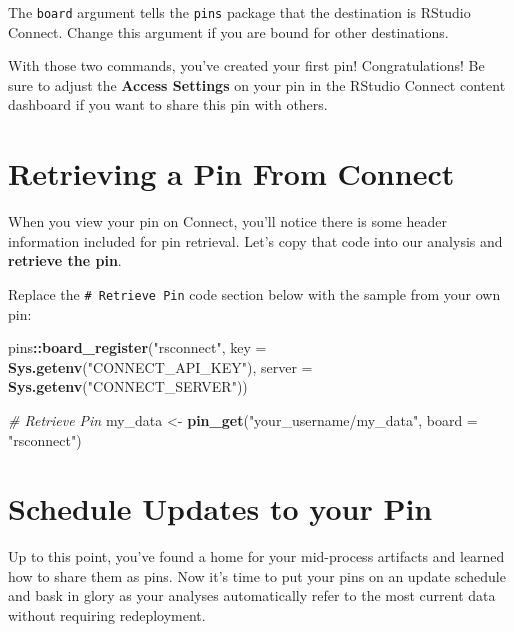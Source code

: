 \documentclass[
  twocolumn]{article}
\newenvironment{Shaded}{\begin{snugshade}}{\end{snugshade}}
\newcommand{\CommentTok}[1]{\textcolor[rgb]{0.56,0.35,0.01}{\textit{#1}}}
\newcommand{\DataTypeTok}[1]{\textcolor[rgb]{0.13,0.29,0.53}{#1}}
\newcommand{\KeywordTok}[1]{\textcolor[rgb]{0.13,0.29,0.53}{\textbf{#1}}}
\newcommand{\NormalTok}[1]{#1}
\newcommand{\OperatorTok}[1]{\textcolor[rgb]{0.81,0.36,0.00}{\textbf{#1}}}
\newcommand{\StringTok}[1]{\textcolor[rgb]{0.31,0.60,0.02}{#1}}
\begin{document}
The \texttt{board} argument tells the \texttt{pins} package that the
destination is RStudio Connect. Change this argument if you are bound
for other destinations.

With those two commands, you've created your first pin! Congratulations!
Be sure to adjust the \textbf{Access Settings} on your pin in the
RStudio Connect content dashboard if you want to share this pin with
others.

\hypertarget{retrieving-a-pin-from-connect}{%
\section{Retrieving a Pin From
Connect}\label{retrieving-a-pin-from-connect}}

When you view your pin on Connect, you'll notice there is some header
information included for pin retrieval. Let's copy that code into our
analysis and \textbf{retrieve the pin}.

Replace the \texttt{\#\ Retrieve\ Pin} code section below with the
sample from your own pin: \vspace{-4truemm}

\begin{Shaded}
\begin{Highlighting}[]
\NormalTok{pins}\OperatorTok{::}\KeywordTok{board_register}\NormalTok{(}\StringTok{"rsconnect"}\NormalTok{,}
               \DataTypeTok{key =} \KeywordTok{Sys.getenv}\NormalTok{(}\StringTok{"CONNECT_API_KEY"}\NormalTok{),}
               \DataTypeTok{server =} \KeywordTok{Sys.getenv}\NormalTok{(}\StringTok{"CONNECT_SERVER"}\NormalTok{))}

\CommentTok{# Retrieve Pin}
\NormalTok{my_data <-}\StringTok{ }\KeywordTok{pin_get}\NormalTok{(}\StringTok{"your_username/my_data"}\NormalTok{, }
                   \DataTypeTok{board =} \StringTok{"rsconnect"}\NormalTok{)}
\end{Highlighting}
\end{Shaded}

\hypertarget{schedule-updates-to-your-pin}{%
\section{Schedule Updates to your
Pin}\label{schedule-updates-to-your-pin}}

Up to this point, you've found a home for your mid-process artifacts and
learned how to share them as pins. Now it's time to put your pins on an
update schedule and bask in glory as your analyses automatically refer
to the most current data without requiring redeployment.
\end{document}
